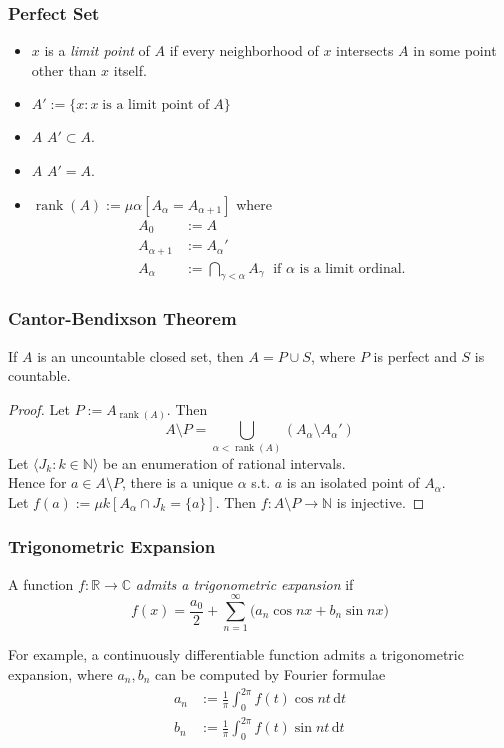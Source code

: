 \documentclass[UTF8,aspectratio=43,11pt,colorlinks,compress,openany]{beamer}%
\begin{document}
\begin{frame}\frametitle{Perfect Set}
	\begin{itemize}
		\item $x$ is a \emph{limit point} of $A$ if every neighborhood of $x$ intersects $A$ in some point other than $x$ itself.
		\item $A':=\big\{x: x\;\text{is a limit point of}\;A\big\}$
		\item $A$  $A'\subset A$.
		\item $A$  $A'=A.$
		\begin{center}
		\end{center}
		\item $\operatorname{rank}(A):=\mu\alpha[A_\alpha=A_{\alpha+1}]$ where
		\begin{align*}
		A_0&:=A\\
		A_{\alpha+1}&:=A_\alpha'\\
		A_\alpha&:=\bigcap\limits_{\gamma<\alpha}A_\gamma\;\mbox{ if $\alpha$ is a limit ordinal.}
		\end{align*}
	\end{itemize}
\end{frame}

\begin{frame}\frametitle{Cantor-Bendixson Theorem}
	\begin{theorem}
		If $A$ is an uncountable closed set, then $A=P\cup S$, where $P$ is perfect and $S$ is countable.
	\end{theorem}\vspace{-1ex}
	\begin{proof}
		Let $P:=A_{\operatorname{rank}(A)}$.
		Then
		\[A\setminus P=\bigcup\limits_{\alpha<\operatorname{rank}(A)}\left(A_\alpha\setminus A_\alpha'\right)\]
		Let $\langle J_k: k\in\mathbb{N}\rangle$ be an enumeration of rational intervals.\\
		Hence for $a\in A\setminus P$, there is a unique $\alpha$ s.t. $a$ is an isolated point of $A_\alpha$.\\
		Let $f(a):=\mu k[A_\alpha\cap J_k=\{a\}]$. Then $f: A\setminus P\to\mathbb{N}$ is injective.
	\end{proof}
\end{frame}

\begin{frame}\frametitle{Trigonometric Expansion}
	\begin{definition}
	A function $f:\mathbb{R}\to\mathbb{C}$ \emph{admits a trigonometric expansion} if
	\[f(x)=\dfrac{a_0}{2}+\sum\limits_{n=1}^\infty\big(a_n\cos nx+b_n\sin nx\big)\]
	\end{definition}
	For example, a continuously differentiable function admits a trigonometric expansion, where $a_n,b_n$ can be computed by Fourier formulae
	\begin{align*}
	a_n&:=\frac{1}{\pi}\int_0^{2\pi}\!\!f(t)\cos nt\,\mathrm{d} t\\
	b_n&:=\frac{1}{\pi}\int_0^{2\pi}\!\!f(t)\sin nt\,\mathrm{d} t
	\end{align*}
\end{frame}
\end{document}
